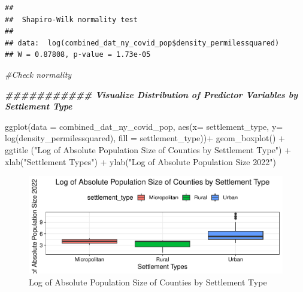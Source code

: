 \documentclass[
  12pt,
]{article}
\newenvironment{Shaded}{\begin{snugshade}}{\end{snugshade}}
\newcommand{\AttributeTok}[1]{\textcolor[rgb]{0.77,0.63,0.00}{#1}}
\newcommand{\CommentTok}[1]{\textcolor[rgb]{0.56,0.35,0.01}{\textit{#1}}}
\newcommand{\DocumentationTok}[1]{\textcolor[rgb]{0.56,0.35,0.01}{\textbf{\textit{#1}}}}
\newcommand{\FunctionTok}[1]{\textcolor[rgb]{0.00,0.00,0.00}{#1}}
\newcommand{\NormalTok}[1]{#1}
\newcommand{\SpecialCharTok}[1]{\textcolor[rgb]{0.00,0.00,0.00}{#1}}
\newcommand{\StringTok}[1]{\textcolor[rgb]{0.31,0.60,0.02}{#1}}
\begin{document}
\begin{Shaded}
\end{Shaded}

\begin{verbatim}
## 
##  Shapiro-Wilk normality test
## 
## data:  log(combined_dat_ny_covid_pop$density_permilessquared)
## W = 0.87808, p-value = 1.73e-05
\end{verbatim}

\begin{Shaded}
\begin{Highlighting}[]
\CommentTok{\#Check normality}
\end{Highlighting}
\end{Shaded}

\begin{Shaded}
\begin{Highlighting}[]
\DocumentationTok{\#\#\#\#\#\#\#\#\#\#\# Visualize Distribution of Predictor Variables by Settlement Type}

\FunctionTok{ggplot}\NormalTok{(}\AttributeTok{data =}\NormalTok{ combined\_dat\_ny\_covid\_pop, }\FunctionTok{aes}\NormalTok{(}\AttributeTok{x=}\NormalTok{ settlement\_type,}
                                             \AttributeTok{y=} \FunctionTok{log}\NormalTok{(density\_permilessquared),}
                                             \AttributeTok{fill =}\NormalTok{ settlement\_type))}\SpecialCharTok{+}
  \FunctionTok{geom\_boxplot}\NormalTok{() }\SpecialCharTok{+}
  \FunctionTok{ggtitle}\NormalTok{ (}\StringTok{"Log of Absolute Population Size of Counties by Settlement Type"}\NormalTok{) }\SpecialCharTok{+}
  \FunctionTok{xlab}\NormalTok{(}\StringTok{"Settlement Types"}\NormalTok{) }\SpecialCharTok{+}
  \FunctionTok{ylab}\NormalTok{(}\StringTok{"Log of Absolute Population Size 2022"}\NormalTok{)}
\end{Highlighting}
\end{Shaded}

\begin{figure}

{\centering \includegraphics{EDA_Final_Group_Project_files/figure-latex/unnamed-chunk-12-1} 

}

\caption{Log of Absolute Population Size of Counties by Settlement Type}\label{fig:unnamed-chunk-12}
\end{figure}
\end{document}

